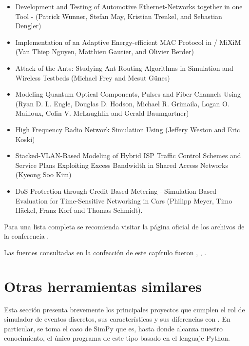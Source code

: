 \begin{itemize}
    \item Development and Testing of Automotive Ethernet-Networks together in
    one Tool - \omnetpp{} (Patrick Wunner, Stefan May, Kristian Trenkel, and
    Sebastian Dengler)

    \item Implementation of an Adaptive Energy-efficient MAC Protocol in
    \omnetpp{} / MiXiM (Van Thiep Nguyen, Matthieu Gautier, and Olivier Berder)

    \item Attack of the Ants: Studying Ant Routing Algorithms in Simulation and
    Wireless Testbeds (Michael Frey and Mesut Günes)

    \item Modeling Quantum Optical Components, Pulses and Fiber Channels Using
    \omnetpp{} (Ryan D. L. Engle, Douglas D. Hodson, Michael R. Grimaila, Logan
    O.  Mailloux, Colin V. McLaughlin and Gerald Baumgartner)

    \item High Frequency Radio Network Simulation Using \omnetpp{} (Jeffery
    Weston and Eric Koski)

    \item Stacked-VLAN-Based Modeling of Hybrid ISP Traffic Control Schemes and
    Service Plans Exploiting Excess Bandwidth in Shared Access Networks (Kyeong
    Soo Kim)

    \item DoS Protection through Credit Based Metering - Simulation Based
    Evaluation for Time-Sensitive Networking in Cars (Philipp Meyer, Timo
    Häckel, Franz Korf and Thomas Schmidt).
\end{itemize}

Para una lista completa se recomienda visitar la página oficial de los archivos
de la conferencia \cite{summit}.

Las fuentes consultadas en la confección de este capítulo fueron \cite{varga1},
\cite{varga2}, \cite{opp_manual}.

\section{Otras herramientas similares}

Esta sección presenta brevemente los principales proyectos que cumplen el rol
de simulador de eventos discretos, sus características y sus diferencias con
\omnetpp{}. En particular, se toma el caso de SimPy que es, hasta donde alcanza
nuestro conocimiento, el único programa de este tipo basado en el lenguaje
Python.

